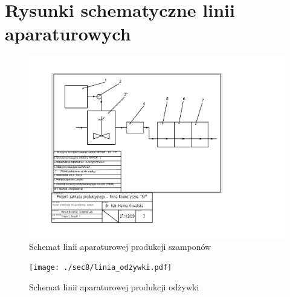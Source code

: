 \section{Rysunki schematyczne linii aparaturowych}

\begin{figure}[h]
	\centering
	\includegraphics[width=\textwidth]{./sec8/linia_szampony.pdf}
	\caption{Schemat linii aparaturowej produkcji szamponów}
\end{figure}

\begin{figure}[h]
	\centering
	\texttt{[image: ./sec8/linia\_odżywki.pdf]}
	\caption{Schemat linii aparaturowej produkcji odżywki}
\end{figure}
